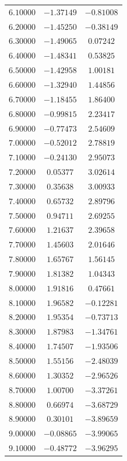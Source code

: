 \documentclass[a4paper,10pt]{article}
\begin{document}
\begin{center}
\begin{longtable}{ |c|c|c| }
$   6.10000 $ & $ -1.37149 $ & $ -0.81008$\\
$   6.20000 $ & $ -1.45250 $ & $ -0.38149$\\
$   6.30000 $ & $ -1.49065 $ & $  0.07242$\\
$   6.40000  $ & $-1.48341  $ & $ 0.53825$\\
$   6.50000 $ & $ -1.42958  $ & $ 1.00181$\\
$   6.60000 $ & $ -1.32940  $ & $ 1.44856$\\
$   6.70000 $ & $ -1.18455 $ & $  1.86400$\\
$   6.80000 $ & $ -0.99815  $ & $ 2.23417$\\
$   6.90000  $ & $-0.77473  $ & $2.54609$\\
$   7.00000 $ & $ -0.52012  $ & $ 2.78819$\\
$   7.10000  $ & $-0.24130 $ & $  2.95073$\\
$   7.20000 $ & $  0.05377  $ & $ 3.02614$\\
$   7.30000 $ & $  0.35638  $ & $ 3.00933$\\
$   7.40000 $ & $  0.65732  $ & $ 2.89796$\\
$   7.50000  $ & $ 0.94711 $ & $  2.69255$\\
$   7.60000 $ & $  1.21637 $ & $  2.39658$\\
$   7.70000 $ & $  1.45603 $ & $  2.01646$\\
$   7.80000$ & $   1.65767$ & $   1.56145$\\
$   7.90000 $ & $  1.81382 $ & $  1.04343$\\
$   8.00000 $ & $  1.91816 $ & $  0.47661$\\
$   8.10000  $ & $ 1.96582 $ & $ -0.12281$\\
$   8.20000 $ & $  1.95354 $ & $ -0.73713$\\
$   8.30000 $ & $  1.87983 $ & $ -1.34761$\\
$   8.40000 $ & $  1.74507 $ & $ -1.93506$\\
$   8.50000  $ & $ 1.55156 $ & $ -2.48039$\\
$   8.60000$ & $   1.30352$ & $  -2.96526$\\
$   8.70000  $ & $ 1.00700 $ & $ -3.37261$\\
$   8.80000  $ & $ 0.66974 $ & $ -3.68729$\\
$   8.90000  $ & $ 0.30101 $ & $ -3.89659$\\
$   9.00000 $ & $ -0.08865$ & $  -3.99065$\\
$   9.10000$ & $  -0.48772$ & $  -3.96295$\\

\end{longtable}
\end{center}
\end{document}
